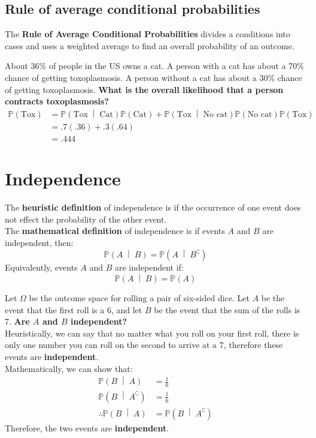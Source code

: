 \documentclass[titlepage, 12pt, leqno]{article}
\begin{document}
\subsection{Rule of average conditional probabilities}
The \textbf{Rule of Average Conditional Probabilities} divides a conditions into cases and uses a weighted average to find an overall probability of an outcome.
\begin{ex}
    About 36\% of people in the US owns a cat. A person with a cat has about a 70\% chance of getting toxoplasmosis. A person without a cat has about a 30\% chance of getting toxoplasmosis. \textbf{What is the overall likelihood that a person contracts toxoplasmosis?}
\begin{align*}
    \mathbb{P}(\text{Tox}) &= \mathbb{P}\left(\text{Tox} \;\middle|\; \text{Cat}\right)\mathbb{P}(\text{Cat}) + \mathbb{P}\left(\text{Tox} \;\middle|\; \text{No cat}\right)\mathbb{P}(\text{No cat})
    \mathbb{P}(\text{Tox}) \\
                           &= .7(.36) + .3(.64) \\
                           &= \boxed{.444}
\end{align*}
\end{ex}
\pagebreak
\section{Independence}
\begin{definition}
    The \textbf{heuristic definition} of independence is if the occurrence of one event does not effect the probability of the other event. \\[.1in]
    The \textbf{mathematical definition} of independence is if events $A$ and $B$ are independent, then:
    \[
        \mathbb{P}\left(A \;\middle|\; B\right) = \mathbb{P}\left(A \;\middle|\; B^\complement\right)     
    \]
    Equivalently, events $A$ and $B$ are independent if:
    \[
    \mathbb{P}\left(A \;\middle|\; B\right) = \mathbb{P}(A)
    \]
\end{definition}

\begin{ex}
    Let $\Omega$ be the outcome space for rolling a pair of six-sided dice. Let $A$ be the event that the first roll is a 6, and let $B$ be the event that the sum of the rolls is 7. \textbf{Are $A$ and $B$ independent?} \\[.1in]
    Heuristically, we can say that no matter what you roll on your first roll, there is only one number you can roll on the second to arrive at a 7, therefore these events are \textbf{independent}. \\[.1in]
    Mathematically, we can show that:
   \begin{align*}
       \mathbb{P}\left(B \;\middle|\; A\right) &= \frac{1}{6} \\[.1in]
       \mathbb{P}\left(B \;\middle|\; A^\complement \right) &= \frac{1}{6} \\[.1in]
       \therefore \mathbb{P}\left(B \;\middle|\; A\right) &= \mathbb{P}\left(B \;\middle|\; A^\complement \right) 
   \end{align*}
   Therefore, the two events are \textbf{independent}. 
    
\end{ex}
\end{document}
